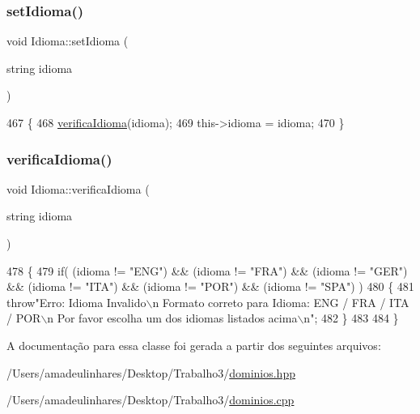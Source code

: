 \subsubsection{\texorpdfstring{set\+Idioma()}{setIdioma()}}
{\footnotesize\ttfamily void Idioma\+::set\+Idioma (\begin{DoxyParamCaption}\item[{string}]{idioma }\end{DoxyParamCaption})}


\begin{DoxyCode}
467 \{
468   \mbox{\hyperlink{class_idioma_a8ea40be7a7fed00c55455009cfc6fc6a}{verificaIdioma}}(idioma);
469   this->idioma = idioma;
470 \}
\end{DoxyCode}
\mbox{\label{class_idioma_a8ea40be7a7fed00c55455009cfc6fc6a}} 
\subsubsection{\texorpdfstring{verifica\+Idioma()}{verificaIdioma()}}
{\footnotesize\ttfamily void Idioma\+::verifica\+Idioma (\begin{DoxyParamCaption}\item[{string}]{idioma }\end{DoxyParamCaption})}


\begin{DoxyCode}
478 \{
479   \textcolor{keywordflow}{if}( (idioma != \textcolor{stringliteral}{"ENG"}) && (idioma != \textcolor{stringliteral}{"FRA"}) && (idioma != \textcolor{stringliteral}{"GER"}) && (idioma != \textcolor{stringliteral}{"ITA"}) && (idioma != \textcolor{stringliteral}{"POR"})
       && (idioma != \textcolor{stringliteral}{"SPA"}) )
480   \{
481     \textcolor{keywordflow}{throw}\textcolor{stringliteral}{"Erro: Idioma Invalido\(\backslash\)n Formato correto para Idioma: ENG / FRA / ITA / POR\(\backslash\)n Por favor escolha um
       dos idiomas listados acima\(\backslash\)n"};
482   \}
483 
484 \}
\end{DoxyCode}


A documentação para essa classe foi gerada a partir dos seguintes arquivos\+:\begin{DoxyCompactItemize}
\item 
/\+Users/amadeulinhares/\+Desktop/\+Trabalho3/\mbox{\hyperlink{dominios_8hpp}{dominios.\+hpp}}\item 
/\+Users/amadeulinhares/\+Desktop/\+Trabalho3/\mbox{\hyperlink{dominios_8cpp}{dominios.\+cpp}}\end{DoxyCompactItemize}
